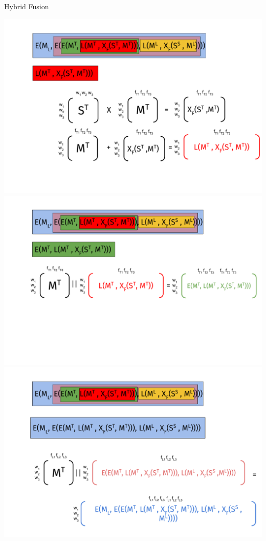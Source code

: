 \documentclass[10pt,xcolor=table]{beamer}
\begin{document}
\begin{frame}{Hybrid Fusion}
\begin{overprint}
	\includegraphics[width=1\linewidth]{image2/Chapitre2/hybrid_fusion2.pdf}%
	\onslide<5>\includegraphics[width=1\linewidth]{image2/Chapitre2/hybrid_fusion3.pdf}%
	\onslide<6>\includegraphics[width=1\linewidth]{image2/Chapitre2/hybrid_fusion4.pdf}%
\end{overprint}
\end{frame}
\end{document}
